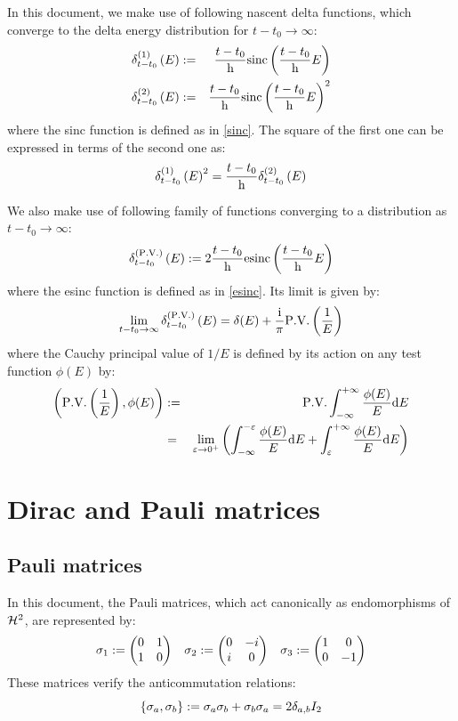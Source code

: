 \documentclass[10pt,a4paper,twoside,openany]{book}
\begin{document}
In this document, we make use of following nascent delta functions, which converge to the delta energy distribution for $t - t_0 \to \infty$:
\begin{eqnarray*}
\delta^{({1})}_{t - t_0} \left({E}\right) & := & \frac{t - t_0} {\mathrm h} \mathrm{sinc} \left( {\frac{t - t_0} {\mathrm h} E} \right) \\
\delta^{({2})}_{t - t_0} \left({E}\right) & := & \frac{t - t_0} {\mathrm h} \mathrm{sinc} \left( {\frac{t - t_0} {\mathrm h} E} \right)^2
\end{eqnarray*}
where the sinc function is defined as in \ref{sinc}. The square of the first one can be expressed in terms of the second one as:
\begin{equation*}
\delta^{({1})}_{t - t_0} \left({E}\right)^2 = \frac{t - t_0} {\mathrm h} \delta^{({2})}_{t - t_0} \left({E}\right)
\end{equation*}

We also make use of following family of functions converging to a distribution as $t - t_0 \to \infty$:
\begin{equation*}
\delta^{({\mathrm{P.V.}})}_{t - t_0} \left({E}\right) := 2 \frac{t - t_0} {\mathrm h} \mathrm{esinc} \left( {\frac{t - t_0} {\mathrm h} E} \right)
\end{equation*}
where the esinc function is defined as in \ref{esinc}. Its limit is given by:
\begin{equation*}
\lim_{t - t_0 \to \infty} \delta^{({\mathrm{P.V.}})}_{t - t_0} \left({E}\right) = \delta(E) + \frac {\mathrm{i}} \pi \mathrm{P.V.} \left( \frac 1 E \right)
\end{equation*}
where the Cauchy principal value of $1/E$ is defined by its action on any test function $\phi(E)$ by:
\begin{eqnarray*}
\left( \mathrm{P.V.} \left( \frac 1 E \right), \phi(E) \right) & := & \mathrm{P.V.} \int_{-\infty}^{+\infty} \frac{\phi(E)}E \mathrm dE \\
& = & \lim_{\varepsilon \to 0^+} \left( \int_{-\infty}^{-\varepsilon} \frac{\phi(E)}E \mathrm dE + \int_{\varepsilon}^{+\infty} \frac{\phi(E)}E \mathrm dE \right)
\end{eqnarray*}

\chapter{Dirac and Pauli matrices}

\section{Pauli matrices}

In this document, the Pauli matrices, which act canonically as endomorphisms of $\mathcal H^2$, are represented by:
$$
\begin{array}{ccc}
\sigma_{1} := \begin{pmatrix} 0 & 1 \\ 1 & 0 \end{pmatrix} &
\sigma_{2} := \begin{pmatrix} 0 & -i \\ i & 0 \end{pmatrix} &
\sigma_{3} := \begin{pmatrix} 1 & 0 \\ 0 & -1 \end{pmatrix}
\end{array}
$$
These matrices verify the anticommutation relations:
\begin{equation*}
\left\{ \sigma_{a}, \sigma_{b} \right\} := \sigma_{a} \sigma_{b} + \sigma_{b} \sigma_{a} = 2 \delta_{a, b} I_2
\end{equation*}
\end{document}

